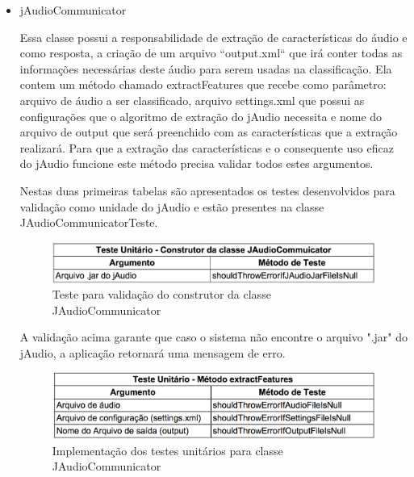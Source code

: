 \begin{itemize}
	\item jAudioCommunicator

Essa classe possui a responsabilidade de extração de características do áudio e como resposta, a criação de um arquivo “output.xml“  que irá conter todas as informações necessárias deste áudio para serem usadas na classificação.  Ela contem um método chamado extractFeatures  que recebe como parâmetro: arquivo de áudio a ser classificado, arquivo settings.xml que possui as configurações que o algoritmo de extração do jAudio necessita e nome do arquivo de output que será preenchido com as características que a extração realizará.  Para que a extração das características e o consequente uso eficaz do jAudio funcione este método precisa validar todos estes argumentos.

Nestas duas primeiras tabelas são apresentados os testes desenvolvidos para validação como unidade do jAudio e estão presentes na classe JAudioCommunicatorTeste.


\begin{figure}[H]
	\centering
	\captionsetup{justification=centering,margin=2cm}
	\includegraphics[scale=0.65]{capitulos/validacao/figuras/testeConstrutorJAudioCommunicator.eps}
	\caption{Teste para validação do construtor da classe JAudioCommunicator}
	\label{fig:result-engajamento}
\end{figure}
	
A validação acima garante que caso o sistema não encontre o arquivo ".jar" do jAudio, a aplicação retornará uma mensagem de erro. 

\begin{figure}[H]
	\centering
	\captionsetup{justification=centering,margin=2cm}
	\includegraphics[scale=0.65]{capitulos/validacao/figuras/testeUniJaudioCommunicator.eps}
	\caption{Implementação dos testes unitários para classe JAudioCommunicator}
	\label{fig:result-engajamento}
\end{figure}


\end{itemize}
